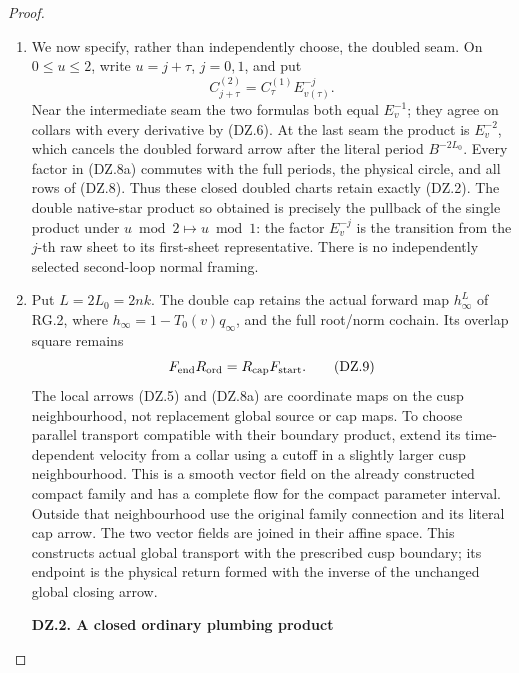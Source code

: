 \begin{proof}
\begin{enumerate}[label=\arabic*.]
\item We now specify, rather than independently choose, the doubled
seam. On \(0\leq u\leq2\), write \(u=j+\tau\), \(j=0,1\), and put
\[
              C^{(2)}_{j+\tau}
                    =C^{(1)}_\tau E_{v(\tau)}^{-j}. \tag{DZ.8a}
\]
Near the intermediate seam the two formulas both equal \(E_v^{-1}\);
they agree on collars with every derivative by (DZ.6). At the last
seam the product is \(E_v^{-2}\), which cancels the doubled
forward arrow after the literal period \(B^{-2L_0}\).
Every factor in (DZ.8a) commutes with the full periods, the physical
circle, and all rows of (DZ.8). Thus these closed doubled charts
retain exactly (DZ.2). The double native-star product so obtained
is precisely the pullback of the single product under
\(u\bmod2\mapsto u\bmod1\): the factor \(E_v^{-j}\) is the
transition from the \(j\)-th raw sheet to its first-sheet
representative. There is no independently selected second-loop
normal framing.

\item Put \(L=2L_0=2nk\). The double cap retains the actual forward map
\(h_\infty^L\) of RG.2,
where \(h_\infty=1-T_0(v)q_\infty\), and the full root/norm
cochain. Its overlap square remains
\[
                   F_{\rm end}R_{\rm ord}
                         =R_{\rm cap}F_{\rm start}.  \tag{DZ.9}
\]
The local arrows (DZ.5) and (DZ.8a) are coordinate maps on the cusp
neighbourhood, not replacement global source or cap maps. To choose
parallel transport compatible with their boundary product, extend
its time-dependent velocity from a collar using a cutoff in a
slightly larger cusp neighbourhood. This is a smooth vector field
on the already constructed compact family and has a complete flow
for the compact parameter interval. Outside that neighbourhood use
the original family connection and its literal cap arrow.
The two vector fields are joined in their affine space. This
constructs actual global transport with the prescribed cusp
boundary; its endpoint is the physical return formed with the
inverse of the unchanged global closing arrow.

\par

\medskip\noindent\textbf{DZ.2. A closed ordinary plumbing product}

\par\nobreak


\end{enumerate}
\end{proof}

